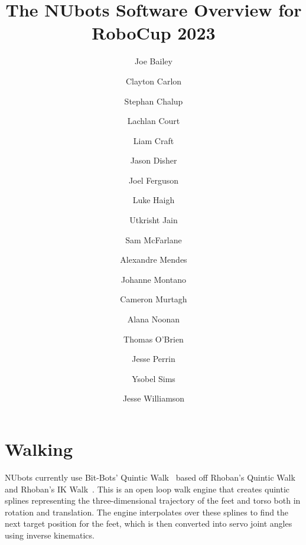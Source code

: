 \documentclass{llncs}
\begin{document}
%

\frontmatter          %
%
\pagestyle{headings}  %
%
%
\mainmatter              %
%
\title{The NUbots Software Overview for RoboCup 2023}
%


\author{Joe Bailey \and Clayton Carlon \and Stephan Chalup \and Lachlan Court \and Liam Craft \and Jason Disher \and Joel Ferguson \and Luke Haigh \and Utkrisht Jain \and Sam McFarlane \and Alexandre Mendes \and Johanne Montano \and Cameron Murtagh \and Alana Noonan \and Thomas O'Brien \and Jesse Perrin \and Ysobel Sims \and Jesse Williamson}
       
%
%
%
%

\maketitle              %

\section{Walking}


\medskip

NUbots currently use Bit-Bots' Quintic Walk~\cite{bitbotsMotionGit} based off Rhoban's Quintic Walk~\cite{rhobanModelGit} and Rhoban's IK Walk~\cite{rhobanModelGit}. This is an open loop walk engine that creates quintic splines representing the three-dimensional trajectory of the feet and torso both in rotation and translation.  The engine interpolates over these splines to find the next target position for the feet, which is then converted into servo joint angles using inverse kinematics.
\end{document}
